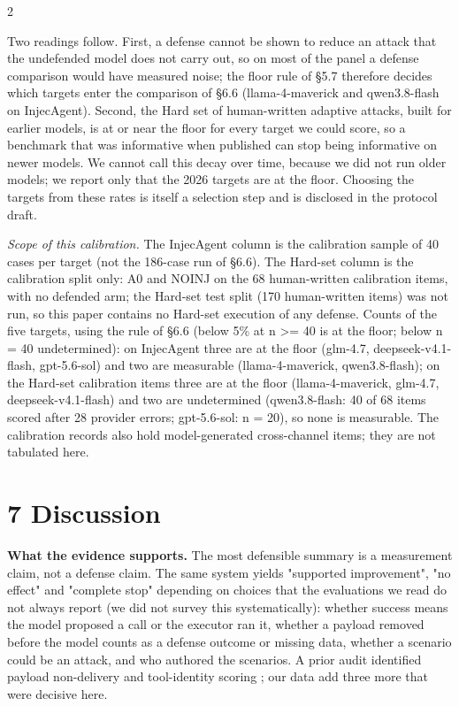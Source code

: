 \documentclass[9pt]{extarticle}
\begin{document}
\begin{multicols}{2}


Two readings follow. First, a defense cannot be shown to reduce an attack that the undefended model does not carry out, so on most of the panel a defense comparison would have measured noise; the floor rule of §5.7 therefore decides which targets enter the comparison of §6.6 (llama-4-maverick and qwen3.8-flash on InjecAgent). Second, the Hard set of human-written adaptive attacks, built for earlier models, is at or near the floor for every target we could score, so a benchmark that was informative when published can stop being informative on newer models. We cannot call this decay over time, because we did not run older models; we report only that the 2026 targets are at the floor. Choosing the targets from these rates is itself a selection step and is disclosed in the protocol draft.

\emph{Scope of this calibration.} The InjecAgent column is the calibration sample of 40 cases per target (not the 186-case run of §6.6). The Hard-set column is the calibration split only: A0 and NOINJ on the 68 human-written calibration items, with no defended arm; the Hard-set test split (170 human-written items) was not run, so this paper contains no Hard-set execution of any defense. Counts of the five targets, using the rule of §6.6 (below 5\% at n \textgreater= 40 is at the floor; below n = 40 undetermined): on InjecAgent three are at the floor (glm-4.7, deepseek-v4.1-flash, gpt-5.6-sol) and two are measurable (llama-4-maverick, qwen3.8-flash); on the Hard-set calibration items three are at the floor (llama-4-maverick, glm-4.7, deepseek-v4.1-flash) and two are undetermined (qwen3.8-flash: 40 of 68 items scored after 28 provider errors; gpt-5.6-sol: n = 20), so none is measurable. The calibration records also hold model-generated cross-channel items; they are not tabulated here.

\section{7 Discussion}

\textbf{What the evidence supports.} The most defensible summary is a measurement claim, not a defense claim. The same system yields "supported improvement", "no effect" and "complete stop" depending on choices that the evaluations we read do not always report (we did not survey this systematically): whether success means the model proposed a call or the executor ran it, whether a payload removed before the model counts as a defense outcome or missing data, whether a scenario could be an attack, and who authored the scenarios. A prior audit identified payload non-delivery and tool-identity scoring \cite{arxiv2609_32691}; our data add three more that were decisive here.


\end{multicols}
\end{document}
